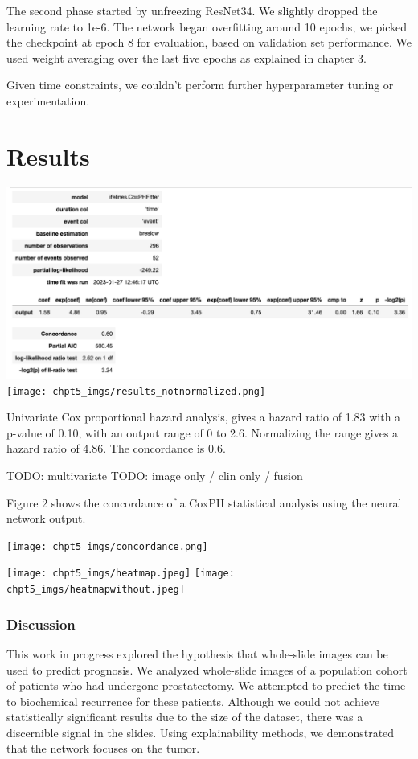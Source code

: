 \documentclass[
  12pt,
  a5,margin=2cmpaper,
]{article}
\begin{document}
The second phase started by unfreezing ResNet34. We slightly dropped the
learning rate to 1e-6. The network began overfitting around 10 epochs,
we picked the checkpoint at epoch 8 for evaluation, based on validation
set performance. We used weight averaging over the last five epochs as
explained in chapter 3.

Given time constraints, we couldn't perform further hyperparameter
tuning or experimentation.

\hypertarget{results}{%
\section{Results}\label{results}}

\includegraphics{chpt5_imgs/results.png}
\texttt{[image: chpt5\_imgs/results\_notnormalized.png]}

Univariate Cox proportional hazard analysis, gives a hazard ratio of
1.83 with a p-value of 0.10, with an output range of 0 to 2.6.
Normalizing the range gives a hazard ratio of 4.86. The concordance is
0.6.

TODO: multivariate TODO: image only / clin only / fusion

Figure 2 shows the concordance of a CoxPH statistical analysis using the
neural network output.

\texttt{[image: chpt5\_imgs/concordance.png]}

\texttt{[image: chpt5\_imgs/heatmap.jpeg]}
\texttt{[image: chpt5\_imgs/heatmapwithout.jpeg]}

\hypertarget{discussion}{%
\subsubsection{Discussion}\label{discussion}}

This work in progress explored the hypothesis that whole-slide images
can be used to predict prognosis. We analyzed whole-slide images of a
population cohort of patients who had undergone prostatectomy. We
attempted to predict the time to biochemical recurrence for these
patients. Although we could not achieve statistically significant
results due to the size of the dataset, there was a discernible signal
in the slides. Using explainability methods, we demonstrated that the
network focuses on the tumor.
\end{document}
